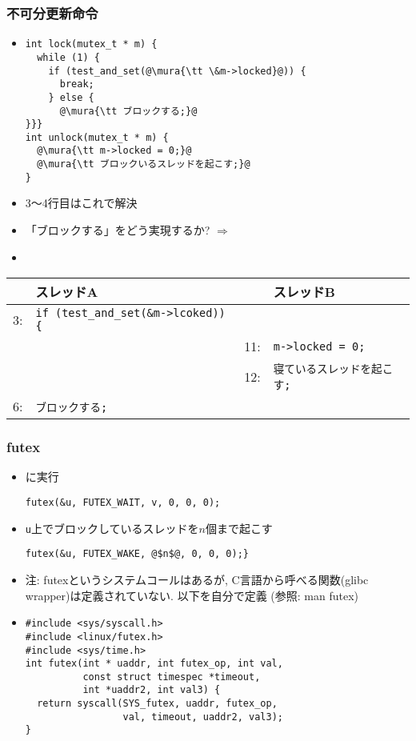 \documentclass[12pt,dvipdfmx]{beamer}
\begin{document}
\begin{frame}[fragile]
  \frametitle{不可分更新命令}
  \begin{itemize}
  \item []
\begin{lstlisting}
int lock(mutex_t * m) {
  while (1) {  
    if (test_and_set(@\mura{\tt \&m->locked}@)) {
      break;
    } else {
      @\mura{\tt ブロックする;}@
}}}
int unlock(mutex_t * m) {
  @\mura{\tt m->locked = 0;}@
  @\mura{\tt ブロックいるスレッドを起こす;}@
}
\end{lstlisting}
\item 3〜4行目はこれで解決
\item 「ブロックする」をどう実現するか? $\Rightarrow$ 
\item {}
\end{itemize}

\begin{center}
  {\scriptsize
\begin{tabular}{|rl|rl|}
    & スレッドA                       &     & スレッドB         \\\hline
3:  & {\tt if (test\_and\_set(\&m->lcoked)) \{} &     &                   \\
    &                                 & 11:  & {\tt m->locked = 0;} \\
    &                                 & 12: & {\tt 寝ているスレッドを起こす;} \\
6:  & {\tt ブロックする;}             &     & \\
\end{tabular}}
\end{center}
\end{frame}

\begin{frame}[fragile]
  \frametitle{futex}
  \begin{itemize}
  \item {}に実行
    \begin{lstlisting}
futex(&u, FUTEX_WAIT, v, 0, 0, 0);
\end{lstlisting}
  \item {\tt u}上でブロックしているスレッドを$n$個まで起こす
\begin{lstlisting}
futex(&u, FUTEX_WAKE, @$n$@, 0, 0, 0);}
\end{lstlisting}
\item 注: futexというシステムコールはあるが,
  C言語から呼べる関数(glibc wrapper)は定義されていない. 以下を自分で定義
  (参照: man futex)
\item 
  \begin{lstlisting}
#include <sys/syscall.h>
#include <linux/futex.h>
#include <sys/time.h>
int futex(int * uaddr, int futex_op, int val,
          const struct timespec *timeout,
          int *uaddr2, int val3) {
  return syscall(SYS_futex, uaddr, futex_op,
                 val, timeout, uaddr2, val3);
}
\end{lstlisting}
\end{itemize}
\end{frame}
\end{document}

